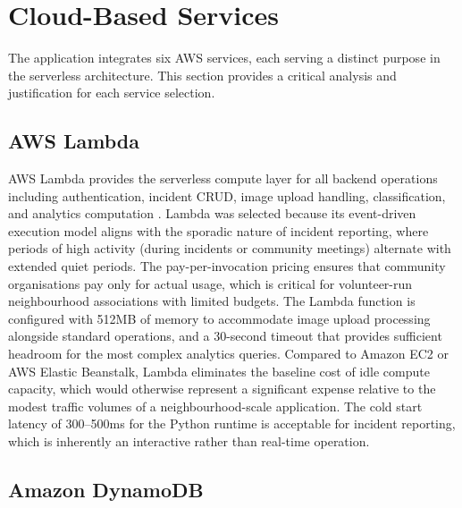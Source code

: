 \documentclass[conference]{IEEEtran}
\begin{document}
\section{Cloud-Based Services}

The application integrates six AWS services, each serving a distinct purpose in the serverless architecture. This section provides a critical analysis and justification for each service selection.

\subsection{AWS Lambda}

AWS Lambda provides the serverless compute layer for all backend operations including authentication, incident CRUD, image upload handling, classification, and analytics computation \cite{awslambda}. Lambda was selected because its event-driven execution model aligns with the sporadic nature of incident reporting, where periods of high activity (during incidents or community meetings) alternate with extended quiet periods. The pay-per-invocation pricing ensures that community organisations pay only for actual usage, which is critical for volunteer-run neighbourhood associations with limited budgets. The Lambda function is configured with 512MB of memory to accommodate image upload processing alongside standard operations, and a 30-second timeout that provides sufficient headroom for the most complex analytics queries. Compared to Amazon EC2 or AWS Elastic Beanstalk, Lambda eliminates the baseline cost of idle compute capacity, which would otherwise represent a significant expense relative to the modest traffic volumes of a neighbourhood-scale application. The cold start latency of 300--500ms for the Python runtime is acceptable for incident reporting, which is inherently an interactive rather than real-time operation.

\subsection{Amazon DynamoDB}
\end{document}
